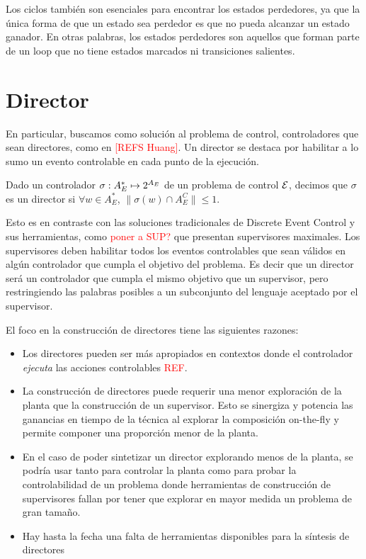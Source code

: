 Los ciclos también son esenciales para encontrar los estados perdedores, ya que la única forma de que un estado sea perdedor es que no pueda alcanzar un estado ganador. En otras palabras, los estados perdedores son aquellos que forman parte de un loop que no tiene estados marcados ni transiciones salientes.


\section{Director} \label{chpt:director}
En particular, buscamos como solución al problema de control, controladores que sean directores, como en \textcolor{red}{[REFS Huang]}. Un director se destaca por habilitar a lo sumo un evento controlable en cada punto de la ejecución. 

\begin{definition}[Director] \label{def:director}
	Dado un controlador $\sigma : A_E^* \mapsto 2^{A_E}$ de un problema de control $\mathcal{E}$, decimos que $\sigma$ es un director si $\forall w \in A_E^*$, $\|\sigma(w) \cap A_E^C\| \leq 1$.	
\end{definition}

Esto es en contraste con las soluciones tradicionales de Discrete Event Control y sus herramientas, como \textcolor{red}{poner a SUP?} que presentan supervisores maximales. Los supervisores deben habilitar todos los eventos controlables que sean válidos en algún controlador que cumpla el objetivo del problema. Es decir que un director será un controlador que cumpla el mismo objetivo que un supervisor, pero restringiendo las palabras posibles a un subconjunto del lenguaje aceptado por el supervisor.

El foco en la construcción de directores tiene las siguientes razones:

\begin{itemize}
	\item Los directores pueden ser más apropiados en contextos donde el controlador \textit{ejecuta} las acciones controlables \textcolor{red}{REF}.
	
	\item La construcción de directores puede requerir una menor exploración de la planta que la construcción de un supervisor. Esto se sinergiza y potencia las ganancias en tiempo de la técnica al explorar la composición on-the-fly y permite componer una proporción menor de la planta.
	
	\item En el caso de poder sintetizar un director explorando menos de la planta, se podría usar tanto para controlar la planta como para probar la controlabilidad de un problema donde herramientas de construcción de supervisores fallan por tener que explorar en mayor medida un problema de gran tamaño.
	
	\item Hay hasta la fecha una falta de herramientas disponibles para la síntesis de directores
\end{itemize}

